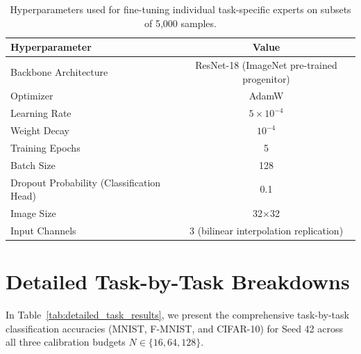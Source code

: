 \documentclass{article}
\theoremstyle{plain}
\theoremstyle{definition}
\theoremstyle{remark}
\begin{document}
\begin{table}[H]
\caption{Hyperparameters used for fine-tuning individual task-specific experts on subsets of 5,000 samples.}
\label{tab:expert_hyperparams}
\vskip 0.15in
\begin{center}
\begin{small}
\begin{tabular}{lc}
\toprule
Hyperparameter & Value \\
\midrule
Backbone Architecture & ResNet-18 (ImageNet pre-trained progenitor) \\
Optimizer & AdamW \\
Learning Rate & $5 \times 10^{-4}$ \\
Weight Decay & $10^{-4}$ \\
Training Epochs & 5 \\
Batch Size & 128 \\
Dropout Probability (Classification Head) & 0.1 \\
Image Size & 32$\times$32 \\
Input Channels & 3 (bilinear interpolation replication) \\
\bottomrule
\end{tabular}
\end{small}
\end{center}
\end{table}

\section{Detailed Task-by-Task Breakdowns}
In Table~\ref{tab:detailed_task_results}, we present the comprehensive task-by-task classification accuracies (MNIST, F-MNIST, and CIFAR-10) for Seed 42 across all three calibration budgets $N \in \{16, 64, 128\}$.
\end{document}
